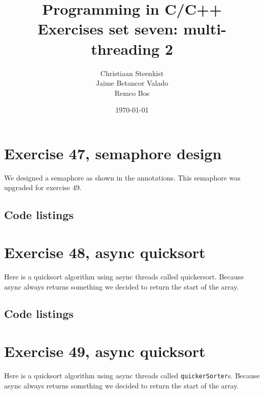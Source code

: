 \documentclass[11pt]{article}
\begin{document}
\title{Programming in C/C++ \\
       Exercises set seven: multi-threading 2
}
\date{\today}
\author{Christiaan Steenkist \\
Jaime Betancor Valado \\
Remco Bos \\
}

\maketitle
\section*{Exercise 47, semaphore design}
We designed a semaphore as shown in the annotations.
This semaphore was upgraded for exercise 49.

\subsection*{Code listings}









\section*{Exercise 48, async quicksort}
Here is a quicksort algorithm using async threads called quickersort.
Because async always returns something we decided to return the start of the array.

\subsection*{Code listings}





\section*{Exercise 49, async quicksort}
Here is a quicksort algorithm using async threads called \texttt{quickerSorter}s.
Because async always returns something we decided to return the start of the array.
\end{document}
